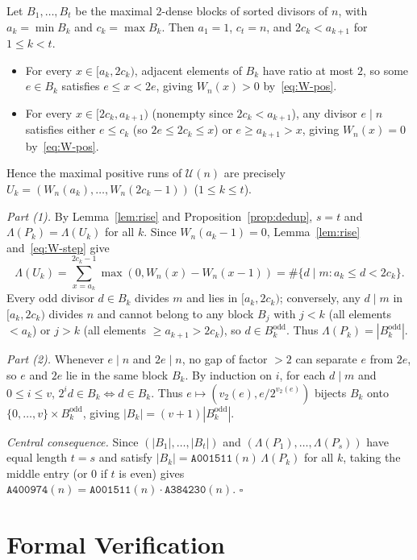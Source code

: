 \documentclass[11pt]{article}
\begin{document}
Let $B_1, \dots, B_t$ be the maximal $2$-dense blocks of sorted divisors of $n$, with $a_k = \min B_k$ and $c_k = \max B_k$. Then $a_1 = 1$, $c_t = n$, and $2c_k < a_{k+1}$ for $1 \le k < t$.
\begin{itemize}
  \item For every $x \in [a_k, 2c_k)$, adjacent elements of $B_k$ have ratio at most $2$, so some $e \in B_k$ satisfies $e \le x < 2e$, giving $W_n(x) > 0$ by~\eqref{eq:W-pos}.
  \item For every $x \in [2c_k, a_{k+1})$ (nonempty since $2c_k < a_{k+1}$), any divisor $e \mid n$ satisfies either $e \le c_k$ (so $2e \le 2c_k \le x$) or $e \ge a_{k+1} > x$, giving $W_n(x) = 0$ by~\eqref{eq:W-pos}.
\end{itemize}
Hence the maximal positive runs of $\mathcal{U}(n)$ are precisely $U_k = (W_n(a_k), \dots, W_n(2c_k - 1))$ ($1 \le k \le t$).

\emph{Part (1).} By Lemma~\ref{lem:rise} and Proposition~\ref{prop:dedup}, $s = t$ and $\Lambda(P_k) = \Lambda(U_k)$ for all $k$. Since $W_n(a_k - 1) = 0$, Lemma~\ref{lem:rise} and~\eqref{eq:W-step} give
\[
  \Lambda(U_k) = \sum_{x = a_k}^{2c_k - 1} \max(0, W_n(x) - W_n(x-1)) = \#\{d \mid m : a_k \le d < 2c_k\}.
\]
Every odd divisor $d \in B_k$ divides $m$ and lies in $[a_k, 2c_k)$; conversely, any $d \mid m$ in $[a_k, 2c_k)$ divides $n$ and cannot belong to any block $B_j$ with $j < k$ (all elements $< a_k$) or $j > k$ (all elements $\ge a_{k+1} > 2c_k$), so $d \in B_k^{\mathrm{odd}}$. Thus $\Lambda(P_k) = |B_k^{\mathrm{odd}}|$.

\emph{Part (2).} Whenever $e \mid n$ and $2e \mid n$, no gap of factor $> 2$ can separate $e$ from $2e$, so $e$ and $2e$ lie in the same block $B_k$. By induction on $i$, for each $d \mid m$ and $0 \le i \le v$, $2^i d \in B_k \iff d \in B_k$. Thus $e \mapsto (v_2(e), e/2^{v_2(e)})$ bijects $B_k$ onto $\{0, \dots, v\} \times B_k^{\mathrm{odd}}$, giving $|B_k| = (v + 1)|B_k^{\mathrm{odd}}|$.

\emph{Central consequence.} Since $(|B_1|, \dots, |B_t|)$ and $(\Lambda(P_1), \dots, \Lambda(P_s))$ have equal length $t = s$ and satisfy $|B_k| = \texttt{A001511}(n)\,\Lambda(P_k)$ for all $k$, taking the middle entry (or $0$ if $t$ is even) gives $\texttt{A400974}(n) = \texttt{A001511}(n) \cdot \texttt{A384230}(n)$. \hfill $\square$

\section{Formal Verification}
\end{document}
